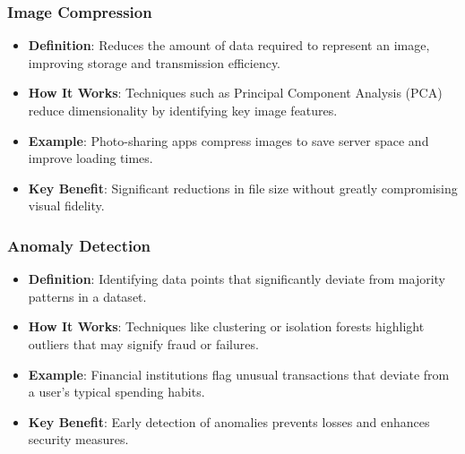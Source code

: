 \documentclass[aspectratio=169]{beamer}
\begin{document}
\begin{frame}[fragile]
    \frametitle{Image Compression}
    \begin{itemize}
        \item \textbf{Definition}: Reduces the amount of data required to represent an image, improving storage and transmission efficiency.
        \item \textbf{How It Works}: Techniques such as Principal Component Analysis (PCA) reduce dimensionality by identifying key image features.
        \item \textbf{Example}: Photo-sharing apps compress images to save server space and improve loading times.
        \item \textbf{Key Benefit}: Significant reductions in file size without greatly compromising visual fidelity.
    \end{itemize}
\end{frame}

\begin{frame}[fragile]
    \frametitle{Anomaly Detection}
    \begin{itemize}
        \item \textbf{Definition}: Identifying data points that significantly deviate from majority patterns in a dataset.
        \item \textbf{How It Works}: Techniques like clustering or isolation forests highlight outliers that may signify fraud or failures.
        \item \textbf{Example}: Financial institutions flag unusual transactions that deviate from a user's typical spending habits.
        \item \textbf{Key Benefit}: Early detection of anomalies prevents losses and enhances security measures.
    \end{itemize}
\end{frame}
\end{document}
